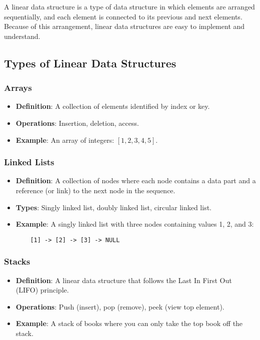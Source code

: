 \documentclass{article}
\begin{document}
A linear data structure is a type of data structure in which elements are arranged sequentially, and each element is connected to its previous and next elements. Because of this arrangement, linear data structures are easy to implement and understand.

\subsection{Types of Linear Data Structures}

\subsubsection{Arrays}
\begin{itemize}
    \item \textbf{Definition}: A collection of elements identified by index or key.
    \item \textbf{Operations}: Insertion, deletion, access.
    \item \textbf{Example}: An array of integers: $[1, 2, 3, 4, 5]$.
\end{itemize}

\subsubsection{Linked Lists}
\begin{itemize}
    \item \textbf{Definition}: A collection of nodes where each node contains a data part and a reference (or link) to the next node in the sequence.
    \item \textbf{Types}: Singly linked list, doubly linked list, circular linked list.
    \item \textbf{Example}: A singly linked list with three nodes containing values 1, 2, and 3:
    \begin{verbatim}
    [1] -> [2] -> [3] -> NULL
    \end{verbatim}
\end{itemize}

\subsubsection{Stacks}
\begin{itemize}
    \item \textbf{Definition}: A linear data structure that follows the Last In First Out (LIFO) principle.
    \item \textbf{Operations}: Push (insert), pop (remove), peek (view top element).
    \item \textbf{Example}: A stack of books where you can only take the top book off the stack.
\end{itemize}
\end{document}
